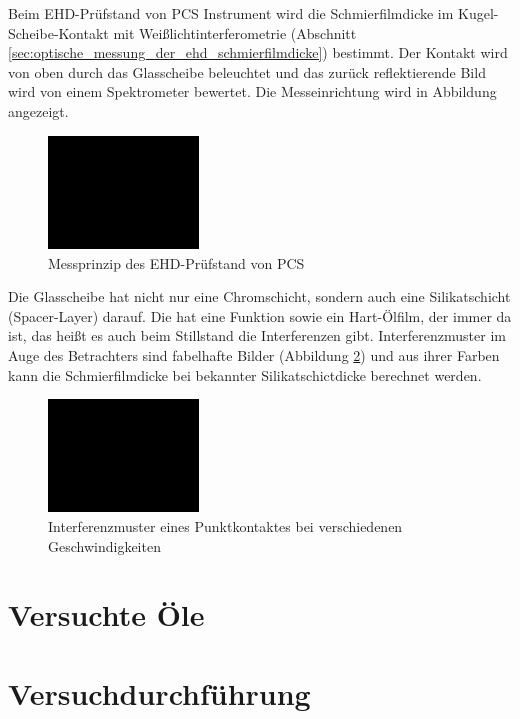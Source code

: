 Beim EHD-Prüfstand von PCS Instrument wird die Schmierfilmdicke im Kugel-Scheibe-Kontakt mit Weißlichtinterferometrie (Abschnitt \ref{sec:optische_messung_der_ehd_schmierfilmdicke}) bestimmt.
Der Kontakt wird von oben durch das Glasscheibe beleuchtet und das zurück reflektierende Bild wird von einem Spektrometer bewertet.
Die Messeinrichtung wird in Abbildung angezeigt.
\begin{figure}[htb]
    \centering
    \includegraphics[width=4cm]{./images/blank_img.jpg}
    \caption{Messprinzip des EHD-Prüfstand von PCS \cite{mach_2008}}
    \label{fig:ehl_messeinrichtung}
\end{figure}
%
Die Glasscheibe hat nicht nur eine Chromschicht, sondern auch eine Silikatschicht (Spacer-Layer) darauf.
Die hat eine Funktion sowie ein Hart-Ölfilm, der immer da ist, das heißt es auch beim Stillstand die Interferenzen gibt.
Interferenzmuster im Auge des Betrachters sind fabelhafte Bilder (Abbildung \ref{fig:ehl_interferenzmuster}) und aus ihrer Farben kann die Schmierfilmdicke bei bekannter Silikatschictdicke berechnet werden.
\begin{figure}[htb]
    \centering
    \includegraphics[width=4cm]{./images/blank_img.jpg}
    \caption{Interferenzmuster eines Punktkontaktes bei verschiedenen Geschwindigkeiten}
    \label{fig:ehl_interferenzmuster}
\end{figure}
%
\section{Versuchte Öle}
\label{sec:versuchte_oele}

\section{Versuchdurchführung}
\label{sec:versuchdurchfuehrung}

